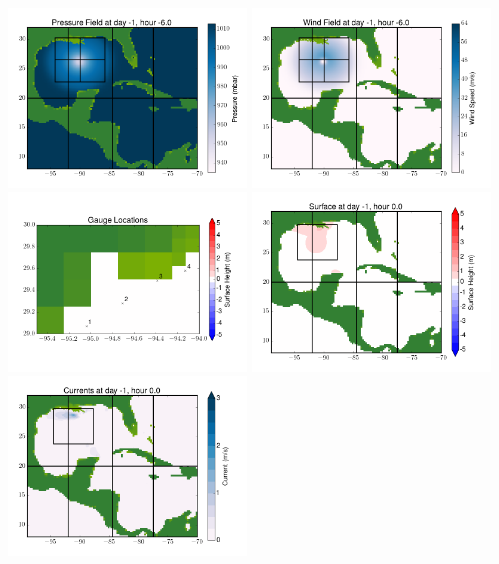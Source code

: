 \documentclass[11pt]{article}
\begin{document}
\includegraphics[width=0.475\textwidth]{frame0007fig8.png}
\vskip 10pt 
\includegraphics[width=0.475\textwidth]{frame0007fig9.png}
\includegraphics[width=0.475\textwidth]{frame0007fig10.png}
\vskip 10pt 
\includegraphics[width=0.475\textwidth]{frame0008fig1.png}
\includegraphics[width=0.475\textwidth]{frame0008fig2.png}
\end{document}
